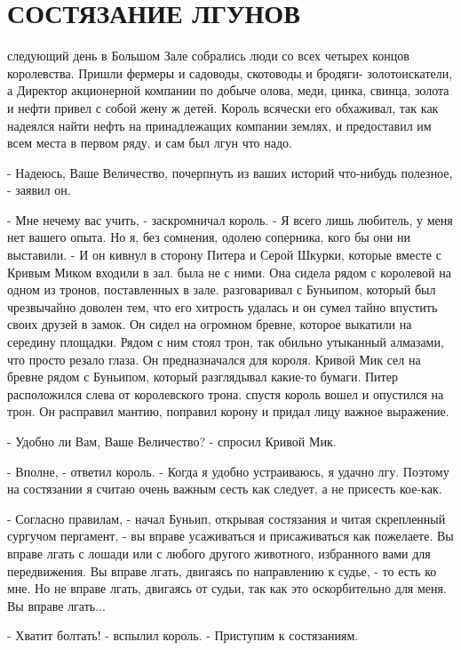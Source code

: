 \chapter{СОСТЯЗАНИЕ ЛГУНОВ}
\par{} следующий день в Большом Зале собрались люди со всех четырех 
концов королевства. Пришли фермеры и садоводы, скотоводы и бродяги-
золотоискатели, а Директор акционерной компании по добыче олова, меди, 
цинка, свинца, золота и нефти привел с собой жену ж детей. Король 
всячески его обхаживал, так как надеялся найти нефть на принадлежащих 
компании землях, и предоставил им всем места в первом ряду.
 и сам был лгун что надо.
\par- Надеюсь, Ваше Величество, почерпнуть из ваших историй что-нибудь 
полезное, - заявил он.
\par- Мне нечему вас учить, - заскромничал король. - Я всего лишь 
любитель, у меня нет вашего опыта. Но я, без сомнения, одолею 
соперника, кого бы они ни выставили. - И он кивнул в сторону Питера и 
Серой Шкурки, которые вместе с Кривым Миком входили в зал.
 была не с ними. Она сидела рядом с королевой на одном из 
тронов, поставленных в зале.
 разговаривал с Буньипом, который был чрезвычайно доволен 
тем, что его хитрость удалась и он сумел тайно впустить своих друзей в 
замок. Он сидел на огромном бревне, которое выкатили на середину 
площадки. Рядом с ним стоял трон, так обильно утыканный алмазами, что 
просто резало глаза. Он предназначался для короля. Кривой Мик сел на 
бревне рядом с Буньипом, который разглядывал какие-то бумаги. Питер 
расположился слева от королевского трона.
 спустя король вошел и опустился на трон. Он расправил 
мантию, поправил корону и придал лицу важное выражение.
\par- Удобно ли Вам, Ваше Величество? - спросил Кривой Мик.
\par- Вполне, - ответил король. - Когда я удобно устраиваюсь, я удачно 
лгу. Поэтому на состязании я считаю очень важным сесть как следует, а 
не присесть кое-как.
\par- Согласно правилам, - начал Буньип, открывая состязания и читая 
скрепленный сургучом пергамент, - вы вправе усаживаться и 
присаживаться как пожелаете. Вы вправе лгать с лошади или с любого 
другого животного, избранного вами для передвижения. Вы вправе лгать, 
двигаясь по направлению к судье, - то есть ко мне. Но не вправе лгать, 
двигаясь от судьи, так как это оскорбительно для меня. Вы вправе 
лгать...
\par- Хватит болтать! - вспылил король. - Приступим к состязаниям. 
